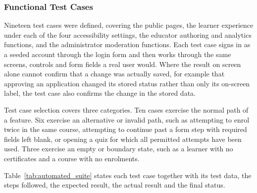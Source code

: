 \documentclass[12pt, oneside]{article} %
\begin{document}
\subsubsection{Functional Test Cases}
\label{sec:functional-tests}

Nineteen test cases were defined, covering the public pages, the learner experience under each of the four accessibility settings, the educator authoring and analytics functions, and the administrator moderation functions. Each test case signs in as a seeded account through the login form and then works through the same screens, controls and form fields a real user would. Where the result on screen alone cannot confirm that a change was actually saved, for example that approving an application changed its stored status rather than only its on-screen label, the test case also confirms the change in the stored data.

Test case selection covers three categories. Ten cases exercise the normal path of a feature. Six exercise an alternative or invalid path, such as attempting to enrol twice in the same course, attempting to continue past a form step with required fields left blank, or opening a quiz for which all permitted attempts have been used. Three exercise an empty or boundary state, such as a learner with no certificates and a course with no enrolments.

Table~\ref{tab:automated_suite} states each test case together with its test data, the steps followed, the expected result, the actual result and the final status.
\end{document}
